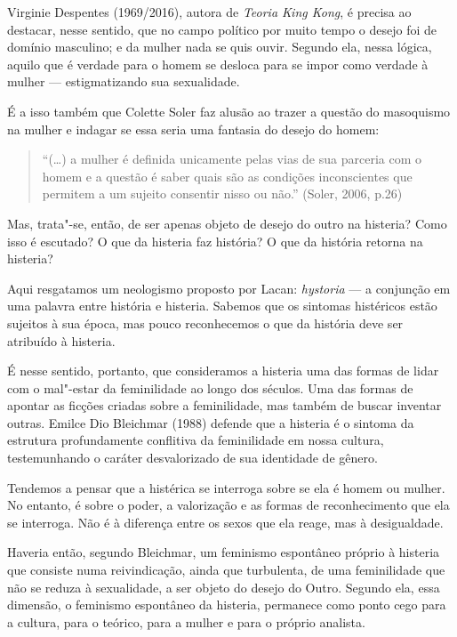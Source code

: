 Virginie Despentes (1969/2016), autora de \emph{Teoria King Kong}, é
precisa ao destacar, nesse sentido, que no campo político por muito
tempo o desejo foi de domínio masculino; e da mulher nada se quis ouvir.
Segundo ela, nessa lógica, aquilo que é verdade para o homem se desloca
para se impor como verdade à mulher --- estigmatizando sua sexualidade.

É a isso também que Colette Soler faz alusão ao trazer a questão do
masoquismo na mulher e indagar se essa seria uma fantasia do desejo do
homem:

\begin{quote}
``(\ldots{}) a mulher é definida unicamente pelas vias de sua parceria com o
homem e a questão é saber quais são as condições inconscientes que
permitem a um sujeito consentir nisso ou não.'' (Soler, 2006, p.26)
\end{quote}

Mas, trata"-se, então, de ser apenas objeto de desejo do outro na
histeria? Como isso é escutado? O que da histeria faz história? O que da
história retorna na histeria?

Aqui resgatamos um neologismo proposto por Lacan: \emph{hystoria} --- a
conjunção em uma palavra entre história e histeria. Sabemos que os
sintomas histéricos estão sujeitos à sua época, mas pouco reconhecemos o
que da história deve ser atribuído à histeria.

É nesse sentido, portanto, que consideramos a histeria uma das formas de
lidar com o mal"-estar da feminilidade ao longo dos séculos. Uma das
formas de apontar as ficções criadas sobre a feminilidade, mas também de
buscar inventar outras. Emilce Dio Bleichmar (1988) defende que a
histeria é o sintoma da estrutura profundamente conflitiva da
feminilidade em nossa cultura, testemunhando o caráter desvalorizado de
sua identidade de gênero.

Tendemos a pensar que a histérica se interroga sobre se ela é homem ou
mulher. No entanto, é sobre o poder, a valorização e as formas de
reconhecimento que ela se interroga. Não é à diferença entre os sexos
que ela reage, mas à desigualdade.

Haveria então, segundo Bleichmar, um feminismo espontâneo próprio à
histeria que consiste numa reivindicação, ainda que turbulenta, de uma
feminilidade que não se reduza à sexualidade, a ser objeto do desejo do
Outro. Segundo ela, essa dimensão, o feminismo espontâneo da histeria,
permanece como ponto cego para a cultura, para o teórico, para a mulher
e para o próprio analista.

